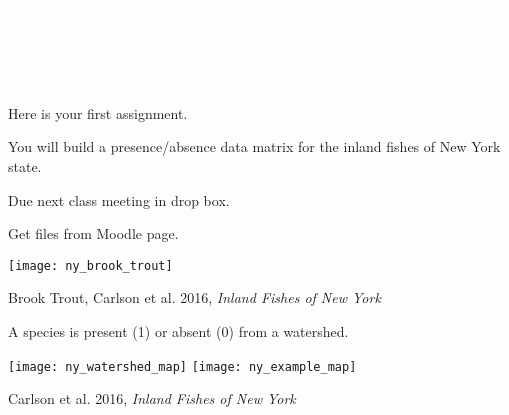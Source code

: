 \documentclass[t]{beamer}
\begin{document}
{
\begin{frame}[b,plain]
\hfill\tiny{\textcolor{white}{Arjuno3, Wikimedia Commons}}
\end{frame}
}

{
\begin{frame}[t,plain]
\end{frame}
}

{
\begin{frame}[t,plain]
\end{frame}
}

{
\begin{frame}[t,plain]{\textcolor{white}{What explains the distribution of organisms living here?}}

	\hangpara\textcolor{white}{Consider ecological and geological time scales.}
\end{frame}
}

%	
%	
%	
%	

\begin{frame}[t,plain]{Here is your first assignment.}

\hangpara You will build a presence/absence data matrix for the inland fishes of \newline New York state.

\hangpara Due next class meeting in drop box.

\hangpara Get files from Moodle page.

{\centering
	\texttt{[image: ny\_brook\_trout]}\par
}

\vfilll

\hfill \tiny Brook Trout, Carlson et al. 2016, \textit{Inland Fishes of New York}
\end{frame}

\begin{frame}{A species is present (1) or absent (0) from a watershed.}


\bigskip

\texttt{[image: ny\_watershed\_map]} \hfill
\texttt{[image: ny\_example\_map]}

\vfilll

\hfill \tiny Carlson et al. 2016, \textit{Inland Fishes of New York}
\end{frame}
\end{document}

